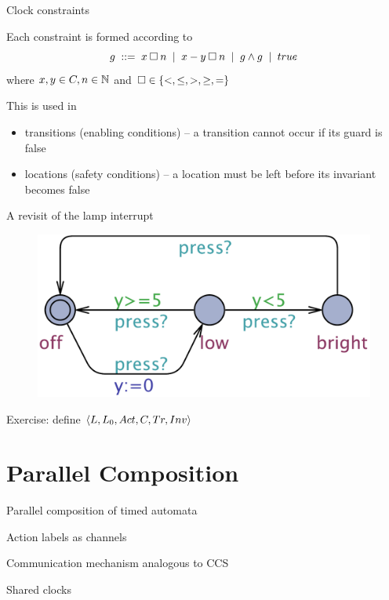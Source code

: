 \documentclass{beamer}
\begin{document}
\begin{slide}{Clock constraints}

Each constraint is formed according to 
\begin{equation*}
  g \; ::=\; x \mathbin{\square} n \; \mid\; x - y \mathbin{\square} n  \; \mid\; g \mathbin{\wedge} g \;\mid\; true
\end{equation*}
where $x,y \in C, n \in \mathbb{N}$ and $\square \in \mathopen{ \{ }<,\leq,>,\geq,=\mathclose{ \} }$

This is used in
\begin{itemize}
\item transitions (enabling conditions) -- a transition cannot occur
  if its guard is false
\item locations (safety conditions) -- a location must be left before
  its invariant becomes false
\end{itemize}

\end{slide}

\begin{frame}{A revisit of the lamp interrupt}
  
\begin{figure}[htb]
  \centering
  \includegraphics[scale=0.35]{./images/Lamp.pdf}\\
\end{figure}

Exercise: define $\mathopen{\langle}L, L_0, Act, C, Tr, Inv\mathclose{\rangle}$ 

\end{frame}

\section{Parallel Composition}

\begin{frame}{Parallel composition of timed automata}

        Action labels as channels

        Communication mechanism analogous to CCS

        Shared clocks
\end{frame}
\end{document}
